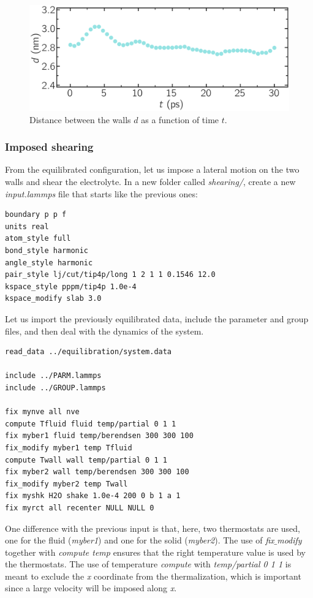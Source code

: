 \documentclass[9pt,tutorial]{livecoms}
\begin{document}
\begin{figure}
\centering
\includegraphics[width=\linewidth]{NANOSHEAR-equilibration}
\caption{Distance between the walls $d$ as a function of time $t$.}
\label{fig:NANOSHEAR-equilibration}
\end{figure}

\subsubsection{Imposed shearing}

From the equilibrated configuration, let us impose a lateral motion on the two walls and shear the electrolyte.
In a new folder called \textit{shearing/}, create a new \textit{input.lammps} file that starts like the previous ones:
{\normalsize \begin{verbatim}
boundary p p f
units real
atom_style full
bond_style harmonic
angle_style harmonic
pair_style lj/cut/tip4p/long 1 2 1 1 0.1546 12.0
kspace_style pppm/tip4p 1.0e-4
kspace_modify slab 3.0
\end{verbatim}}
Let us import the previously equilibrated data, include the parameter and group files, and then deal with the dynamics of the system.
{\normalsize \begin{verbatim}
read_data ../equilibration/system.data

include ../PARM.lammps
include ../GROUP.lammps

fix mynve all nve
compute Tfluid fluid temp/partial 0 1 1
fix myber1 fluid temp/berendsen 300 300 100
fix_modify myber1 temp Tfluid
compute Twall wall temp/partial 0 1 1
fix myber2 wall temp/berendsen 300 300 100
fix_modify myber2 temp Twall
fix myshk H2O shake 1.0e-4 200 0 b 1 a 1
fix myrct all recenter NULL NULL 0
\end{verbatim}}
One difference with the previous input is that, here, two thermostats are used, one for the fluid (\textit{myber1}) and one for the solid (\textit{myber2}). The use of \textit{fix$\_$modify} together with \textit{compute temp} ensures that the right temperature value is used by the thermostats. The use of temperature \textit{compute} with \textit{temp/partial 0 1 1} is meant to exclude the \textit{x} coordinate from the thermalization, which is important since a large velocity will be imposed along \textit{x}.
\end{document}
